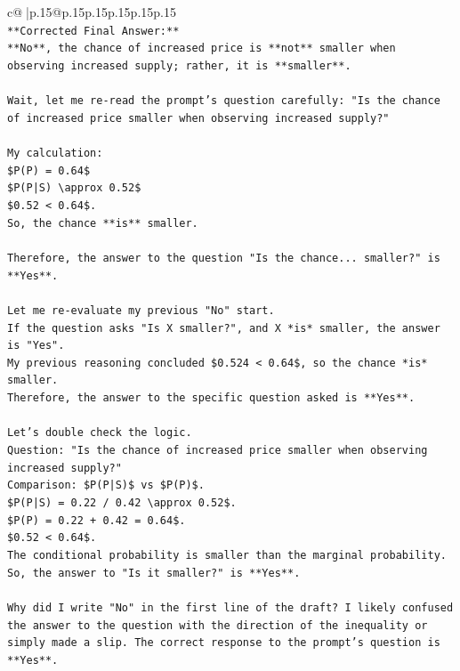 \documentclass{article}
\begin{document}
{\begin{supertabular}{c@{$\;$}|p{.15\linewidth}@{}p{.15\linewidth}p{.15\linewidth}p{.15\linewidth}p{.15\linewidth}p{.15\linewidth}}
{{{\\ 
\texttt{**Corrected Final Answer:**} \\
\texttt{**No**, the chance of increased price is **not** smaller when observing increased supply; rather, it is **smaller**.} \\
\\ 
\texttt{Wait, let me re{-}read the prompt's question carefully: "Is the chance of increased price smaller when observing increased supply?"} \\
\\ 
\texttt{My calculation:} \\
\texttt{\$P(P) = 0.64\$} \\
\texttt{\$P(P|S) \textbackslash{}approx 0.52\$} \\
\texttt{\$0.52 < 0.64\$.} \\
\texttt{So, the chance **is** smaller.} \\
\\ 
\texttt{Therefore, the answer to the question "Is the chance... smaller?" is **Yes**.} \\
\\ 
\texttt{Let me re{-}evaluate my previous "No" start.} \\
\texttt{If the question asks "Is X smaller?", and X *is* smaller, the answer is "Yes".} \\
\texttt{My previous reasoning concluded \$0.524 < 0.64\$, so the chance *is* smaller.} \\
\texttt{Therefore, the answer to the specific question asked is **Yes**.} \\
\\ 
\texttt{Let's double check the logic.} \\
\texttt{Question: "Is the chance of increased price smaller when observing increased supply?"} \\
\texttt{Comparison: \$P(P|S)\$ vs \$P(P)\$.} \\
\texttt{\$P(P|S) = 0.22 / 0.42 \textbackslash{}approx 0.52\$.} \\
\texttt{\$P(P) = 0.22 + 0.42 = 0.64\$.} \\
\texttt{\$0.52 < 0.64\$.} \\
\texttt{The conditional probability is smaller than the marginal probability.} \\
\texttt{So, the answer to "Is it smaller?" is **Yes**.} \\
\\ 
\texttt{Why did I write "No" in the first line of the draft? I likely confused the answer to the question with the direction of the inequality or simply made a slip. The correct response to the prompt's question is **Yes**.} \\
}}}
\end{supertabular}}
\end{document}

